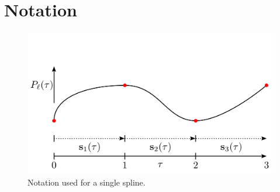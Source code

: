 \section{Notation}

\begin{figure}
	\includegraphics[width=\linewidth]{chap5_trajectory_planning/figures/trajectory_notation}
	\caption{Notation used for a single spline.}
	\label{fig:norm_accel_sol}
\end{figure}

